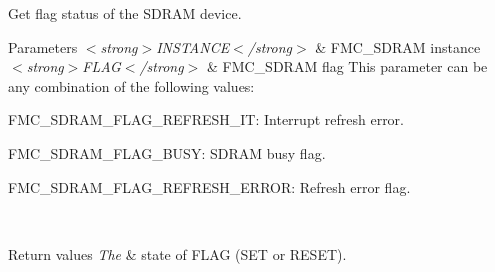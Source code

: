 Get flag status of the S\+D\+R\+AM device. 


\begin{DoxyParams}{Parameters}
{\em $<$strong$>$\+I\+N\+S\+T\+A\+N\+C\+E$<$/strong$>$} & F\+M\+C\+\_\+\+S\+D\+R\+AM instance \\
\hline
{\em $<$strong$>$\+F\+L\+A\+G$<$/strong$>$} & F\+M\+C\+\_\+\+S\+D\+R\+AM flag This parameter can be any combination of the following values\+: \begin{DoxyItemize}
\item F\+M\+C\+\_\+\+S\+D\+R\+A\+M\+\_\+\+F\+L\+A\+G\+\_\+\+R\+E\+F\+R\+E\+S\+H\+\_\+\+IT\+: Interrupt refresh error. \item F\+M\+C\+\_\+\+S\+D\+R\+A\+M\+\_\+\+F\+L\+A\+G\+\_\+\+B\+U\+SY\+: S\+D\+R\+AM busy flag. \item F\+M\+C\+\_\+\+S\+D\+R\+A\+M\+\_\+\+F\+L\+A\+G\+\_\+\+R\+E\+F\+R\+E\+S\+H\+\_\+\+E\+R\+R\+OR\+: Refresh error flag. \end{DoxyItemize}
\\
\hline
\end{DoxyParams}

\begin{DoxyRetVals}{Return values}
{\em The} & state of F\+L\+AG (S\+ET or R\+E\+S\+ET). \\
\hline
\end{DoxyRetVals}
